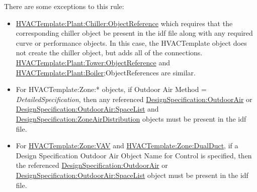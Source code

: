 There are some exceptions to this rule:

\begin{itemize}
\item
  \hyperref[hvactemplateplantchillerobjectreference]{HVACTemplate:Plant:Chiller:ObjectReference} which requires that the corresponding chiller object be present in the idf file along with any required curve or performance objects. In this case, the HVACTemplate object does not create the chiller object, but adds all of the connections. \hyperref[hvactemplateplanttowerobjectreference]{HVACTemplate:Plant:Tower:ObjectReference} and \hyperref[hvactemplateplantboiler]{HVACTemplate:Plant:Boiler};ObjectReferences are similar.
\item
  For HVACTemplate:Zone:* objects, if Outdoor Air Method = \emph{DetailedSpecification}, then any referenced \hyperref[designspecificationoutdoorair]{DesignSpecification:OutdoorAir} or \hyperref[designspecificationoutdoorairspacelist]{DesignSpecification:OutdoorAir:SpaceList} and \hyperref[designspecificationzoneairdistribution]{DesignSpecification:ZoneAirDistribution} objects must be present in the idf file.
\item
  For \hyperref[hvactemplatezonevav]{HVACTemplate:Zone:VAV} and \hyperref[hvactemplatezonedualduct]{HVACTemplate:Zone:DualDuct}, if a Design Specification Outdoor Air Object Name for Control is specified, then the referenced \hyperref[designspecificationoutdoorair]{DesignSpecification:OutdoorAir} or \hyperref[designspecificationoutdoorairspacelist]{DesignSpecification:OutdoorAir:SpaceList} object must be present in the idf file.
\end{itemize}